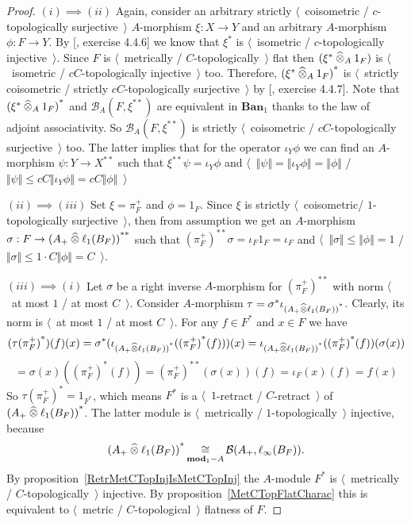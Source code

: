 \begin{proof} $(i)\implies (ii)$ Again, consider an arbitrary strictly 
$\langle$~coisometric / $c$-topologically surjective~$\rangle$ $A$-morphism
$\xi:X\to Y$ and an arbitrary $A$-morphism $\phi:F\to Y$. By
[\cite{HelLectAndExOnFuncAn}, exercise 4.4.6] we know that $\xi^*$ is
$\langle$~isometric / $c$-topologically injective~$\rangle$. Since $F$ is
$\langle$~metrically / $C$-topologically~$\rangle$ flat then
$(\xi^*\mathbin{\widehat{\otimes}}_{A}1_F)$ is $\langle$~isometric / $cC$-topologically
injective~$\rangle$ too. Therefore, ${(\xi^*\mathbin{\widehat{\otimes}}_{A}1_F)}^*$ is
$\langle$~strictly coisometric / strictly $cC$-topologically
surjective~$\rangle$ by [\cite{HelLectAndExOnFuncAn}, exercise 4.4.7]. Note that
${(\xi^*\mathbin{\widehat{\otimes}}_{A}1_F)}^*$ and $\mathcal{B}_A(F,\xi^{**})$ are equivalent
in $\mathbf{Ban}_1$ thanks to the law of adjoint associativity. So
$\mathcal{B}_A(F,\xi^{**})$ is strictly $\langle$~coisometric / 
$cC$-topologically surjective~$\rangle$ too. The latter implies that for the
operator $\iota_Y\phi$ we can find an $A$-morphism $\psi:Y\to X^{**}$ such that
$\xi^{**}\psi=\iota_Y\phi$ and
$\langle$~$\Vert\psi\Vert=\Vert\iota_Y\phi\Vert=\Vert\phi\Vert$ /
$\Vert\psi\Vert\leq cC\Vert\iota_Y\phi\Vert=cC\Vert\phi\Vert$~$\rangle$

$(ii)\implies (iii)$ Set $\xi=\pi_F^+$ and $\phi=1_F$. Since $\xi$ is
strictly $\langle$~coisometric/ $1$-topologically surjective~$\rangle$,
then from assumption we get an $A$-morphism $\sigma:F\to
{(A_+\mathbin{\widehat{\otimes}}\ell_1(B_F))}^{**}$ such that 
${(\pi_F^+)}^{**}\sigma
=\iota_F 1_F
=\iota_F$ 
and $\langle$~$\Vert\sigma\Vert\leq \Vert\phi\Vert=1$ /
$\Vert\sigma\Vert\leq 1\cdot C\Vert\phi\Vert=C$~$\rangle$.

$(iii)\implies (i)$ Let $\sigma$ be a right inverse $A$-morphism for
${(\pi_F^+)}^{**}$ with norm $\langle$~at most $1$ / at most $C$~$\rangle$.
Consider $A$-morphism $\tau=\sigma^*\iota_{{(A_+\mathbin{\widehat{\otimes}}\ell_1(B_F))}^*}$.
Clearly, its norm is $\langle$~at most $1$ / at most $C$~$\rangle$. For any
$f\in F^*$ and $x\in F$ we have
$$
({\tau(\pi_F^+)}^*)(f)(x)
=\sigma^*(\iota_{{(A_+\mathbin{\widehat{\otimes}}\ell_1(B_F))}^*}({(\pi_F^+)}^*(f)))(x)
=\iota_{{(A_+\mathbin{\widehat{\otimes}}\ell_1(B_F))}^*}({(\pi_F^+)}^*(f))(\sigma(x))
$$
$$
=\sigma(x)({(\pi_F^+)}^*(f))
={(\pi_F^+)}^{**}(\sigma(x))(f)
=\iota_F(x)(f)
=f(x)
$$
So ${\tau(\pi_F^+)}^*=1_{F^*}$, which means $F^*$ is a 
$\langle$~$1$-retract / $C$-retract~$\rangle$ of
${(A_+\mathbin{\widehat{\otimes}}\ell_1(B_F))}^*$. The latter module is $\langle$~metrically /
$1$-topologically~$\rangle$ injective, because 
$$
{(A_+\mathbin{\widehat{\otimes}}\ell_1(B_F))}^*
\mathop{\mathbin{\cong}}\limits_{\mathbf{mod}_1-A}
\mathcal{B}(A_+,\ell_\infty(B_F)).
$$ 
By proposition~\ref{RetrMetCTopInjIsMetCTopInj} the $A$-module $F^*$ is
$\langle$~metrically / $C$-topologically~$\rangle$ injective. By 
proposition~\ref{MetCTopFlatCharac} this is
equivalent to $\langle$~metric / $C$-topological~$\rangle$ flatness of $F$.
\end{proof}

